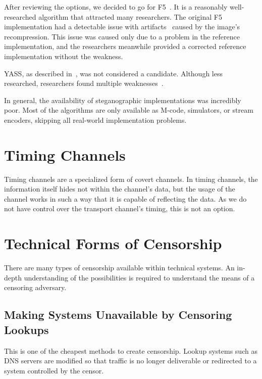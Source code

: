 After reviewing the options, we decided to go for F5~\cite{f5}. It is a reasonably well-researched algorithm that attracted many researchers. The original F5 implementation had a detectable issue with artifacts~\cite{F5broken} caused by the image's recompression. This issue was caused only due to a problem in the reference implementation, and the researchers meanwhile provided a corrected reference implementation without the weakness.


YASS, as described in~\cite{solanki2007yass}, was not considered a candidate. Although less researched, researchers found multiple weakness\-es~\cite{kodovsky2010modern,li2009steganalysis}.


In general, the availability of steganographic implementations was incredibly poor. Most of the algorithms are only available as M-code, simulators, or stream encoders, skipping all real-world implementation problems.

\section{Timing Channels}

Timing channels are a specialized form of covert channels. In timing channels, the information itself hides not within the channel's data, but the usage of the channel works in such a way that it is capable of reflecting the data. As we do not have control over the transport channel's timing, this is not an option.

\section{Technical Forms of Censorship}
There are many types of censorship available within technical systems. An in-depth understanding of the possibilities is required to understand the means of a censoring adversary.

\subsection{Making Systems Unavailable by Censoring Lookups}
This is one of the cheapest methods to create censorship. Lookup systems such as DNS servers are modified so that traffic is no longer deliverable or redirected to a system controlled by the censor.

